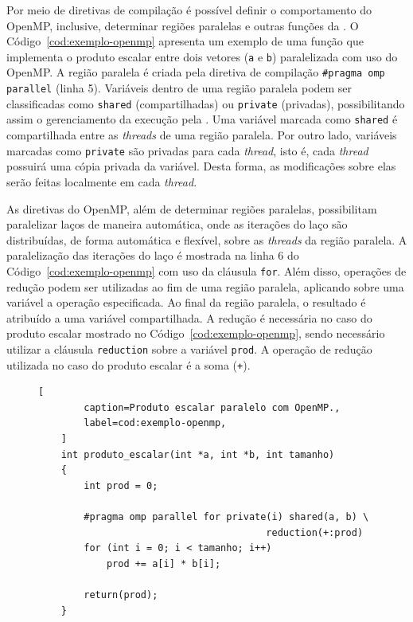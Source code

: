 Por meio de diretivas de compilação é possível definir o comportamento do
OpenMP, inclusive, determinar regiões paralelas e outras funções da \api.
O Código~\ref{cod:exemplo-openmp} apresenta um exemplo de uma função
que implementa o produto escalar entre dois vetores (\texttt{a} e \texttt{b}) paralelizada
com uso do OpenMP. A região paralela é criada pela diretiva de compilação
\texttt{\#pragma omp parallel} (linha 5). Variáveis dentro de uma região paralela
podem ser classificadas como \texttt{shared} (compartilhadas) ou \texttt{private} (privadas),
possibilitando assim o gerenciamento da execução pela \api. Uma variável marcada como \texttt{shared}
é compartilhada entre as \textit{threads} de uma região paralela. Por outro lado, variáveis marcadas
como \texttt{private} são privadas para cada \textit{thread}, isto é, cada \textit{thread} possuirá uma
cópia privada da variável. Desta forma, as modificações sobre elas serão feitas localmente em cada
\textit{thread}.

As diretivas do OpenMP, além de determinar regiões paralelas, possibilitam
paralelizar laços de maneira automática, onde as iterações
do laço são distribuídas, de forma automática e flexível, sobre as
\textit{threads} da região paralela. A paralelização das iterações do laço é mostrada na linha 6 do
Código~\ref{cod:exemplo-openmp} com uso da cláusula \texttt{for}. Além disso, operações de redução podem ser
utilizadas ao fim de uma região paralela, aplicando sobre uma variável a
operação especificada. Ao final da região paralela, o resultado é atribuído a uma variável compartilhada. A redução
é necessária no caso do produto escalar mostrado no Código~\ref{cod:exemplo-openmp}, sendo necessário
utilizar a cláusula \texttt{reduction} sobre a variável \texttt{prod}. A operação de redução utilizada no caso do produto
escalar é a soma (\texttt{+}).

\begin{figure}[t]
	\begin{lstlisting}[
		caption=Produto escalar paralelo com OpenMP.,
		label=cod:exemplo-openmp,
	]
	int produto_escalar(int *a, int *b, int tamanho)
	{
		int prod = 0;

		#pragma omp parallel for private(i) shared(a, b) \
                                        reduction(+:prod)
		for (int i = 0; i < tamanho; i++)
			prod += a[i] * b[i];

		return(prod);
	}
	\end{lstlisting}
\end{figure}

